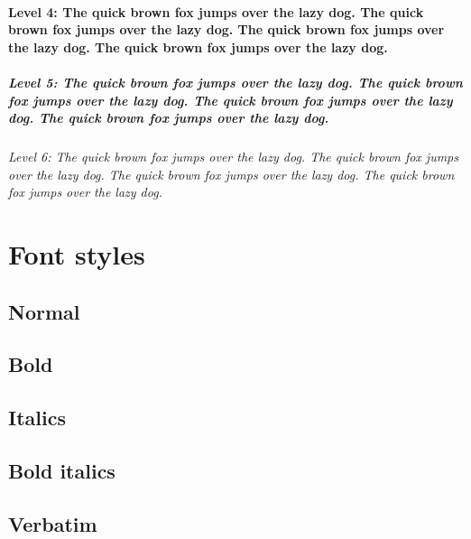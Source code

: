 \documentclass[9pt, twoside]{extreport}
\begin{document}
\subsubsection*{Level 4: The quick brown fox jumps over the lazy dog. The quick brown fox jumps over the lazy dog. The quick brown fox jumps over the lazy dog. The quick brown fox jumps over the lazy dog.}
\paragraph*{Level 5: The quick brown fox jumps over the lazy dog. The quick brown fox jumps over the lazy dog. The quick brown fox jumps over the lazy dog. The quick brown fox jumps over the lazy dog.}
\subparagraph*{Level 6: The quick brown fox jumps over the lazy dog. The quick brown fox jumps over the lazy dog. The quick brown fox jumps over the lazy dog. The quick brown fox jumps over the lazy dog.}







\chapter{Font styles}

\section{Normal}

\lipsum[13-14]

\section{Bold}

\textbf{\lipsum[15-16]}

\section{Italics}

\textit{\lipsum[17-18]}

\section{Bold italics}

\textit{\textbf{\lipsum[19]}}

\textbf{\textit{\lipsum[20]}}

\section{Verbatim}

\texttt{\lipsum[21-22]}
\end{document}
